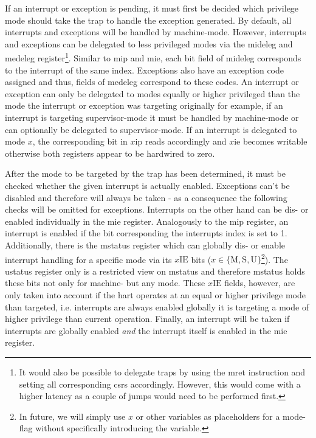 If an interrupt or exception is pending, it must first be decided which privilege mode should take the trap to handle the exception generated.
By default, all interrupts and exceptions will be handled by machine-mode.
However, interrupts and exceptions can be delegated to less privileged modes via the \gls{mideleg} and \gls{medeleg} register\footnote{%
    It would also be possible to delegate traps by using the \gls{mret} instruction and setting all corresponding \glspl{csr} accordingly.
    However, this would come with a higher latency as a couple of jumps would need to be performed first.
}.
Similar to \gls{mip} and \gls{mie}, each bit field of \gls{mideleg} corresponds to the interrupt of the same index.
Exceptions also have an exception code assigned and thus, fields of \gls{medeleg} correspond to these codes.
An interrupt or exception can only be delegated to modes equally or higher privileged than the mode the interrupt or exception was targeting originally for example, if an interrupt is targeting supervisor-mode it must be handled by machine-mode or can optionally be delegated to supervisor-mode.
If an interrupt is delegated to mode $ x $, the corresponding bit in $ x\text{ip} $ reads accordingly and $ x\text{ie} $ becomes writable otherwise both registers appear to be hardwired to zero.

After the mode to be targeted by the trap has been determined, it must be checked whether the given interrupt is actually enabled.
Exceptions can't be disabled and therefore will always be taken - as a consequence the following checks will be omitted for exceptions.
Interrupts on the other hand can be dis- or enabled individually in the \gls{mie} register.
Analogously to the \gls{mip} register, an interrupt is enabled if the bit corresponding the interrupts index is set to 1.
Additionally, there is the \gls{mstatus} register which can globally dis- or enable interrupt handling for a specific mode via its $ x\text{IE} $ bits ($ x \in \{ \text{M}, \text{S}, \text{U}\} $\footnote{%
    In future, we will simply use $ x $ or other variables as placeholders for a mode-flag without specifically introducing the variable.
}).
The \gls{ustatus} register only is a restricted view on \gls{mstatus} and therefore \gls{mstatus} holds these bits not only for machine- but any mode.
These $ x\text{IE} $ fields, however, are only taken into account if the \gls{hart} operates at an equal or higher privilege mode than targeted, i.e. interrupts are always enabled globally it is targeting a mode of higher privilege than current operation.
Finally, an interrupt will be taken if interrupts are globally enabled \textit{and} the interrupt itself is enabled in the \gls{mie} register.

